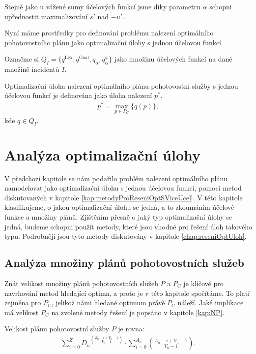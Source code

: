 Stejně jako u vážené sumy účelových funkcí jsme díky parametru $\alpha$ schopni upřednostit maximalizování $s'$ nad $-u'$.

Nyní máme prostředky pro definování problému nalezení optimálního pohotovostního plánu jako optimalizační úlohy s jednou účelovou funkcí.

Označme si $Q_I = \{ q^{\text{Lex}}, q^{\text{Goal}}, q_{\alpha}, q_{\alpha}^{\varphi}\}$ jako množinu účelových funkcí na dané množině incidentů $I$.
\begin{definice}\label{df:optUloha1uc}
  Optimalizační úloha nalezení optimálního plánu pohotovostní služby s jednou účelovou funkcí je definována jako úloha nalezení $p^*$,
  \begin{align}
    p^* = \max_{p \in P_C} \{ q(p) \},
  \end{align}
  kde $q \in Q_I$.
\end{definice}

\section{Analýza optimalizační úlohy}

V předchozí kapitole se nám podařilo problém nalezení optimálního plánu namodelovat jako optimalizační úlohu s jednou účelovou funkcí,
pomocí metod diskutovaných v kapitole \ref{kap:metodyProReseniOptSViceUcel}.
V této kapitole klasifikujeme, o jakou optimalizační úlohu se jedná, a to zkoumáním účelové funkce a množiny plánů.
Zjištěním přesně o jaký typ optimalizační úlohy se jedná, budeme schopni použít metody, které jsou vhodné pro řešení úloh takového typu.
Podrobněji jsou tyto metody diskutovány v kapitole \ref{chap:reseniOptUloh}.

\subsection{Analýza množiny plánů pohotovostních služeb}\label{kap:analP}

Znát velikost množiny plánů pohotovostních služeb $P$ a $P_C$ je klíčové pro navrhování metod hledající optima, a proto je v této kapitole spočítáme.
To platí zejména pro $P_C$, jelikož námi hledané optimum právě $P_C$ náleží.
Jaké implikace má velikost $P_C$ na zvolené metody řešení je popsáno v kapitole \ref{kap:NP}.

\begin{veta}\label{veta:velikostP}
  Velikost plánu pohotovostní služby $P$ je rovna:
  \begin{align*}
    \sum_{i = 0}^{Z_n} {D_n}^{\binom{Z_n - i + V_n - 1}{V_n - 1}} \cdot \sum_{i = 0}^{A_n} {\binom{A_n - i + V_n - 1}{V_n - 1}}.
  \end{align*}
\end{veta}

